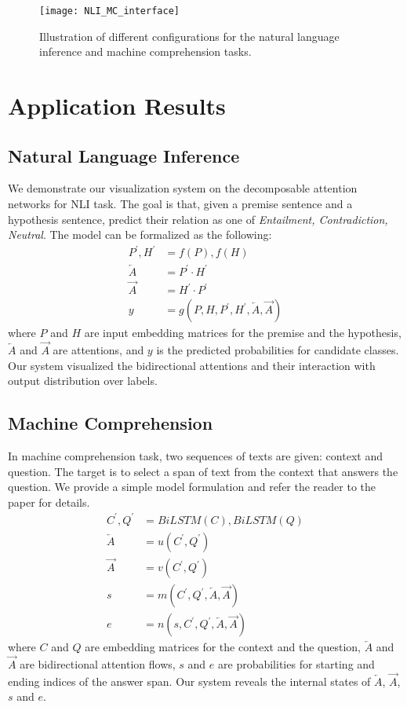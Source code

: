 \begin{figure*}[t]
\centering
\vspace{-2mm}
 \texttt{[image: NLI\_MC\_interface]}
  \vspace{-6mm}
 \caption{
Illustration of different configurations for the natural language inference and machine comprehension tasks.
}
\label{fig:pipelineUpdate}
\end{figure*}

\section{Application Results}


\subsection{Natural Language Inference}
We demonstrate our visualization system on the decomposable attention networks
for NLI task. The goal is that, given a premise sentence and a hypothesis sentence,
predict their relation as one of \emph{Entailment, Contradiction, Neutral}.
The model can be formalized as the following:
\begin{align}
	P^\prime, H^\prime &= f(P), f(H)\\
	\overleftarrow{A} &= P^\prime \cdot H^\prime\\
	\overrightarrow{A} &= H^\prime \cdot P^\prime\\
	y &= g(P, H, P^\prime, H^\prime, \overleftarrow{A}, \overrightarrow{A})
\end{align}
where $P$ and $H$ are input embedding matrices for the premise and the hypothesis, $\overleftarrow{A}$
and $\overrightarrow{A}$ are attentions, and $y$ is the predicted probabilities for candidate classes.
Our system visualized the bidirectional attentions and their interaction with output distribution over labels.


\subsection{Machine Comprehension}
In machine comprehension task, two sequences of texts are given: context and question.
The target is to select a span of text from the context that answers the question. We provide a simple model
formulation and refer the reader to the paper for details.
\begin{align}
	C^\prime, Q^\prime &= BiLSTM(C), BiLSTM(Q)\\
	\overleftarrow{A} &= u(C^\prime, Q^\prime)\\
	\overrightarrow{A} &= v(C^\prime, Q^\prime)\\
	s &= m(C^\prime, Q^\prime, \overleftarrow{A}, \overrightarrow{A})\\
	e &= n(s, C^\prime, Q^\prime, \overleftarrow{A}, \overrightarrow{A})
\end{align}
where $C$ and $Q$ are embedding matrices for the context and the question,
$\overleftarrow{A}$ and $\overrightarrow{A}$ are bidirectional attention flows,
$s$ and $e$ are probabilities for starting and ending indices of the answer span.
Our system reveals the internal states of $\overleftarrow{A}$, $\overrightarrow{A}$,
$s$ and $e$.
